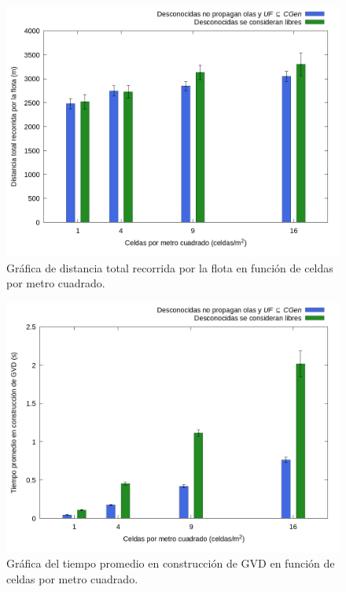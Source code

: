 \begin{figure}[H]
  \centerfloat

  \includegraphics[clip=true, width=\graphlen]{imagenes/graficas_chicas/graficas_histo_num/desconocido/exploration_cost.png}

  \caption{Gráfica de distancia total recorrida por la flota en función de celdas por metro cuadrado.}\label{fig:gra:des:ec}

\end{figure}

\begin{figure}[H]
  \centerfloat

  \includegraphics[clip=true, width=\graphlen]{imagenes/graficas_chicas/graficas_histo_num/desconocido/gvd_construction_time_mean.png}

  \caption{Gráfica del tiempo promedio en construcción de GVD en función de celdas por metro cuadrado.}\label{fig:gra:des:gvdt}

\end{figure}

